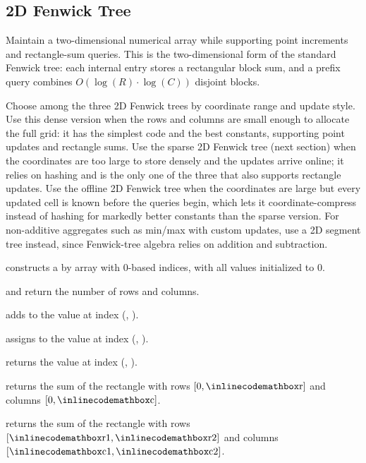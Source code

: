 \subsection{2D Fenwick Tree}
\label{sec:2.7.5}
Maintain a two-dimensional numerical array while supporting point increments and rectangle-sum queries. This is the two-dimensional form of the standard Fenwick tree: each internal entry stores a rectangular block sum, and a prefix query combines $O(\log\left(R\right) \cdot \log\left(C\right))$ disjoint blocks.

Choose among the three 2D Fenwick trees by coordinate range and update style. Use this dense version when the rows and columns are small enough to allocate the full grid: it has the simplest code and the best constants, supporting point updates and rectangle sums. Use the sparse 2D Fenwick tree (next section) when the coordinates are too large to store densely and the updates arrive online; it relies on hashing and is the only one of the three that also supports rectangle updates. Use the offline 2D Fenwick tree when the coordinates are large but every updated cell is known before the queries begin, which lets it coordinate-compress instead of hashing for markedly better constants than the sparse version. For non-additive aggregates such as min/max with custom updates, use a 2D segment tree instead, since Fenwick-tree algebra relies on addition and subtraction.

\begin{compactitem}
  \item {} constructs a  by  array with 0-based indices, with all values initialized to $0$.
  \item {} and  return the number of rows and columns.
  \item {} adds  to the value at index (, ).
  \item {} assigns  to the value at index (, ).
  \item {} returns the value at index (, ).
  \item {} returns the sum of the rectangle with rows $[0, {\inlinecodemath{r}}]$ and columns $[0, {\inlinecodemath{c}}]$.
  \item {} returns the sum of the rectangle with rows $[{\inlinecodemath{r1}}, {\inlinecodemath{r2}}]$ and columns $[{\inlinecodemath{c1}}, {\inlinecodemath{c2}}]$.
\end{compactitem}

